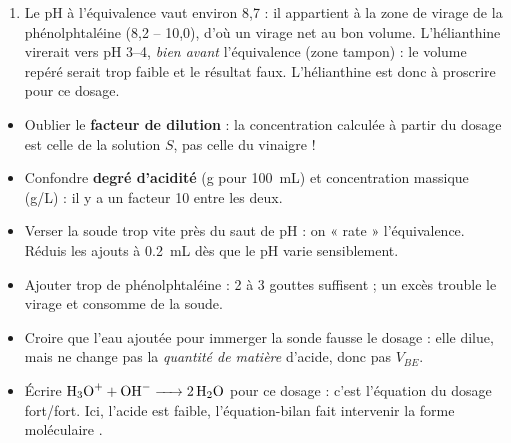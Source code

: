 \documentclass[11pt]{article}
\newcounter{popsec}
\newcounter{popsub}
\newcommand{\courssub}[1]{%
  \stepcounter{popsub}%
  \par\vspace{9pt}\noindent{\popxbold\fontsize{11.5}{13}\selectfont\color{popink}{\color{poporange}\thepopsec.\thepopsub}\hspace{6pt}#1}\par\nopagebreak\vspace{4pt}
}
\begin{document}
\begin{exoresolu}
\begin{enumerate}
\[ \gamma = C_0 \times M = \SI{1,0}{mol.L^{-1}} \times \SI{60}{g.mol^{-1}} = \SI{60}{g.L^{-1}} \]
Le degré d'acidité est la masse d'acide dans \SI{100}{mL} (soit \SI{0,100}{L}) :
\[ \text{Degré} = \gamma \times \SI{0,100}{L} = \SI{60}{g.L^{-1}} \times \SI{0,100}{L} = \SI{6,0}{g} \]
Le vinaigre est donc à \textbf{6,0\textdegree}. \textbf{Conclusion :} l'écart avec l'étiquette est nul (ou inférieur à l'incertitude expérimentale, de l'ordre de 5 \%) : l'étiquette est \textbf{conforme}.
\item Le pH à l'équivalence vaut environ 8,7 : il appartient à la zone de virage de la phénolphtaléine (8,2 -- 10,0), d'où un virage net au bon volume. L'hélianthine virerait vers pH 3--4, \emph{bien avant} l'équivalence (zone tampon) : le volume repéré serait trop faible et le résultat faux. L'hélianthine est donc à proscrire pour ce dosage.
\end{enumerate}
\end{exoresolu}

\begin{attention}
\begin{itemize}
\item Oublier le \textbf{facteur de dilution} : la concentration calculée à partir du dosage est celle de la solution $S$, pas celle du vinaigre !
\item Confondre \textbf{degré d'acidité} (g pour \SI{100}{mL}) et concentration massique (g/L) : il y a un facteur 10 entre les deux.
\item Verser la soude trop vite près du saut de pH : on « rate » l'équivalence. Réduis les ajouts à \SI{0,2}{mL} dès que le pH varie sensiblement.
\item Ajouter trop de phénolphtaléine : 2 à 3 gouttes suffisent ; un excès trouble le virage et consomme de la soude.
\item Croire que l'eau ajoutée pour immerger la sonde fausse le dosage : elle dilue, mais ne change pas la \emph{quantité de matière} d'acide, donc pas $V_{BE}$.
\item Écrire $\ce{H3O+ + OH- -> 2H2O}$ pour ce dosage : c'est l'équation du dosage fort/fort. Ici, l'acide est faible, l'équation-bilan fait intervenir la forme moléculaire .
\end{itemize}
\end{attention}

\courssub{Conclusion}
\end{document}
